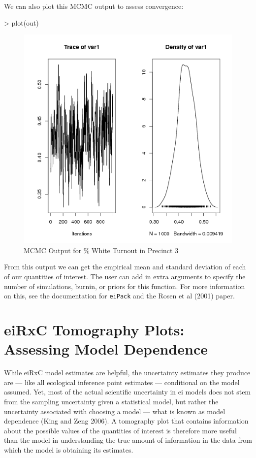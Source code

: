 \documentclass[11pt,oneside,letterpaper,titlepage]{article}
\begin{document}
We can also plot this MCMC output to assess convergence:
\begin{Schunk}
\begin{Sinput}
> plot(out)
\end{Sinput}
\end{Schunk}

\begin{figure}[Ht]
\begin{center}
\includegraphics{MCMCplot.png} 
\end{center}
\caption{MCMC Output for \% White Turnout in Precinct 3}
\end{figure}

\noindent From this output we can get the empirical mean and standard
deviation of each of our quantities of interest.  The user can add in
extra arguments to specify the number of simulations, burnin, or
priors for this function.  For more information on this, see the
documentation for \verb#eiPack# and the Rosen et al (2001) paper.

\clearpage

\section{eiRxC Tomography Plots: Assessing Model Dependence}

While eiRxC model estimates are helpful, the uncertainty estimates
they produce are --- like all ecological inference point estimates ---
conditional on the model assumed. Yet, most of the actual scientific
uncertainty in ei models does not stem from the sampling uncertainty
given a statistical model, but rather the uncertainty associated with
choosing a model --- what is known as model dependence (King and Zeng 2006). A tomography plot that contains information about
the possible values of the quantities of interest is therefore more
useful than the model in understanding the true amount of information
in the data from which the model is obtaining its estimates.\\ 
\end{document}
